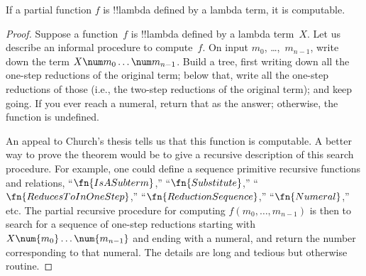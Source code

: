 \documentclass[../../../include/open-logic-section]{subfiles}
\begin{document}

\begin{thm}
If a partial function $f$ is !!{lambda defined} by a lambda term, it is
computable.
\end{thm}

\begin{proof}
Suppose a function~$f$ is !!{lambda defined} by a lambda term~$X$. Let us
describe an informal procedure to compute~$f$. On input $m_0$,
\dots,~$m_{n-1}$, write down the term $X \num m_0 \ldots \num
m_{n-1}$. Build a tree, first writing down all the one-step reductions
of the original term; below that, write all the one-step reductions of
those (i.e., the two-step reductions of the original term); and keep
going. If you ever reach a numeral, return that as the answer;
otherwise, the function is undefined.

An appeal to Church's thesis tells us that this function is
computable. A better way to prove the theorem would be to give a
recursive description of this search procedure. For example, one
could define a sequence primitive recursive functions and relations,
``$\fn{IsASubterm}$,'' ``$\fn{Substitute}$,''
``$\fn{ReducesToInOneStep}$,'' ``$\fn{ReductionSequence}$,''
``$\fn{Numeral}$,'' etc. The partial recursive procedure for computing
$f(m_0, \dots, m_{n-1})$ is then to search for a sequence of one-step
reductions starting with $X \num{m_0} \dots \num{m_{n-1}}$ and ending
with a numeral, and return the number corresponding to that numeral.
The details are long and tedious but otherwise routine.
\end{proof}
\end{document}
